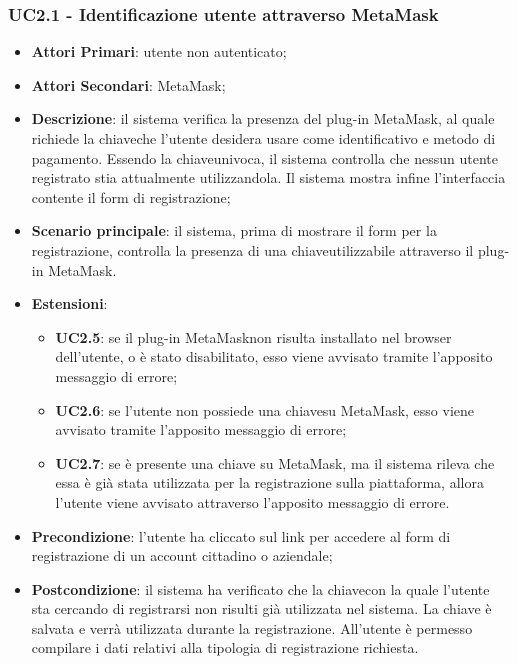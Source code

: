 \subsubsection{UC2.1 - Identificazione utente attraverso MetaMask}
\begin{itemize}
	\item \textbf{Attori Primari}: utente non autenticato;
	\item \textbf{Attori Secondari}: MetaMask\glo;
	\item \textbf{Descrizione}: il sistema verifica la presenza del plug-in MetaMask\glo, al quale richiede la chiave\glosp che l'utente desidera usare come identificativo e metodo di pagamento. Essendo la chiave\glosp univoca, il sistema controlla che nessun utente registrato stia attualmente utilizzandola. Il sistema mostra infine l'interfaccia contente il form di registrazione;
	\item \textbf{Scenario principale}: il sistema, prima di mostrare il form per la registrazione, controlla la presenza di una chiave\glosp utilizzabile attraverso il plug-in MetaMask\glosp.
	\item \textbf{Estensioni}:
	\begin{itemize}
		\item \textbf{UC2.5}: se il plug-in MetaMask\glosp non risulta installato nel browser dell'utente, o è stato disabilitato, esso viene avvisato tramite l'apposito messaggio di errore;
		\item \textbf{UC2.6}: se l'utente non possiede una chiave\glosp su MetaMask\glosp, esso viene avvisato tramite l'apposito messaggio di errore;
		\item \textbf{UC2.7}: se è presente una chiave su MetaMask\glosp, ma il sistema rileva che essa è già stata utilizzata per la registrazione sulla piattaforma, allora l'utente viene avvisato attraverso l'apposito messaggio di errore.
	\end{itemize}
	\item \textbf{Precondizione}: l'utente ha cliccato sul link per accedere al form di registrazione di un account cittadino o aziendale;
	\item \textbf{Postcondizione}: il sistema ha verificato che la chiave\glosp con la quale l'utente sta cercando di registrarsi non risulti già utilizzata nel sistema. La chiave è salvata e verrà utilizzata durante la registrazione. All'utente è permesso compilare i dati relativi alla tipologia di registrazione richiesta.
	
\end{itemize}
